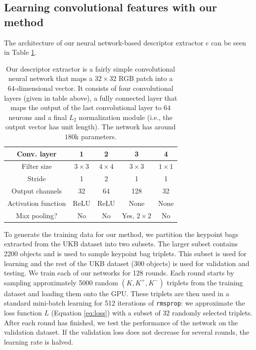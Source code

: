\documentclass[10pt,conference,a4paper]{IEEEtran}
\begin{document}
		\subsection{Learning convolutional features with our method}
			The architecture of our neural network-based descriptor extractor $e$ can be seen in Table \ref{tbl:nn}.
			\begin{table}
				\resizebox{\columnwidth}{!}
				{
				\begin{tabular}{|c||c|c|c|c|}
					\hline
					Conv. layer	&	1	&	2	&	3	&	4	\\
					\hline
					\hline
					Filter size	&	$3\times 3$	&	$4\times 4$	&	$3\times 3$	&	$1\times 1$	\\
					\hline
					Stride	&	1	&	2	&	1	&	1	\\
					\hline
					Output channels	&	32	&	64	&	128	&	32	\\
					\hline
					Activation function	&	ReLU	&	ReLU	&	None	&	None	\\
					\hline
					Max pooling?	& No	&	No	&	Yes, $2\times2$	&	No	\\
					\hline
				\end{tabular}
				}
				\caption
				{
					Our descriptor extractor is a fairly simple convolutional neural network that maps a $32\times 32$ RGB patch into a $64$-dimensional vector.
					It consists of four convolutional layers (given in table above), a fully connected layer that maps the output of the last convolutional layer to $64$ neurons and a final $L_2$ normalization module (i.e., the output vector has unit length).
					The network has around $180$k parameters.
				}
				\label{tbl:nn}
			\end{table}
			To generate the training data for our method, we partition the keypoint bags extracted from the UKB dataset into two subsets.
			The larger subset contains 2200 objects and is used to sample keypoint bag triplets.
			This subset is used for learning and the rest of the UKB dataset (300 objects) is used for validation and testing.
			We train each of our networks for 128 rounds.
			Each round starts by sampling approximately 5000 random $(K, K^+, K^-)$ triplets from the training dataset and loading them onto the GPU.
			These triplets are then used in a standard mini-batch learning for 512 iterations of \texttt{rmsprop}:
			we approximate the loss function $L$ (Equation \eqref{eq:loss}) with a subset of $32$ randomly selected triplets.
			After each round has finished, we test the performance of the network on the validation dataset.
			If the validation loss does not decrease for several rounds, the learning rate is halved.
\end{document}
